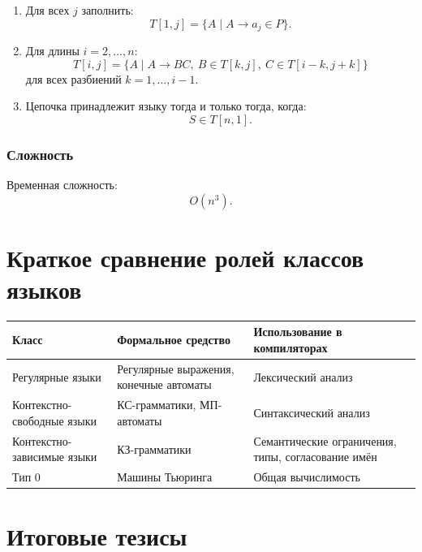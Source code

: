 \documentclass[12pt,a4paper]{article}
\begin{document}
\begin{enumerate}
    \item Для всех $j$ заполнить:
    \[
    T[1,j]=\{A\mid A\to a_j\in P\}.
    \]

    \item Для длины $i=2,\ldots,n$:
    \[
    T[i,j]=
    \{A\mid A\to BC,\ B\in T[k,j],\ C\in T[i-k,j+k]\}
    \]
    для всех разбиений $k=1,\ldots,i-1$.

    \item Цепочка принадлежит языку тогда и только тогда, когда:
    \[
    S\in T[n,1].
    \]
\end{enumerate}

\subsubsection*{Сложность}

Временная сложность:
\[
O(n^3).
\]

\section{Краткое сравнение ролей классов языков}

\begin{center}
\begin{tabular}{>{\centering\arraybackslash}m{3cm}
                >{\centering\arraybackslash}m{4cm}
                >{\centering\arraybackslash}m{5cm}}
\toprule
Класс & Формальное средство & Использование в компиляторах \\
\midrule
Регулярные языки & Регулярные выражения, конечные автоматы & Лексический анализ \\
Контекстно-свободные языки & КС-грамматики, МП-автоматы & Синтаксический анализ \\
Контекстно-зависимые языки & КЗ-грамматики & Семантические ограничения, типы, согласование имён \\
Тип 0 & Машины Тьюринга & Общая вычислимость \\
\bottomrule
\end{tabular}
\end{center}

\section{Итоговые тезисы}
\end{document}
